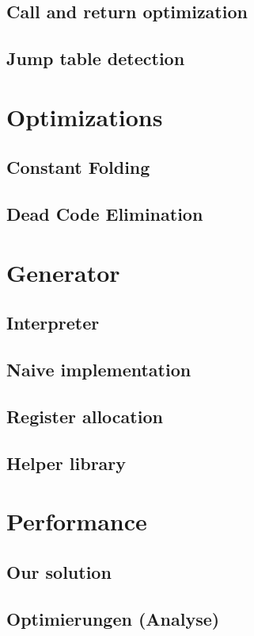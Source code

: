 \documentclass[course=eragp]{aspdoc}
\begin{document}
\subsection{Call and return optimization}
\subsection{Jump table detection}

\section{Optimizations}
\subsection{Constant Folding}\label{constant_folding}

\subsection{Dead Code Elimination}\label{dead_code_elimination}

\clearpage

\section{Generator}
\subsection{Interpreter}
\subsection{Naive implementation}
\subsection{Register allocation}
\subsection{Helper library}

\section{Performance}
\subsection{Our solution}
\subsection{Optimierungen (Analyse)}
\end{document}
